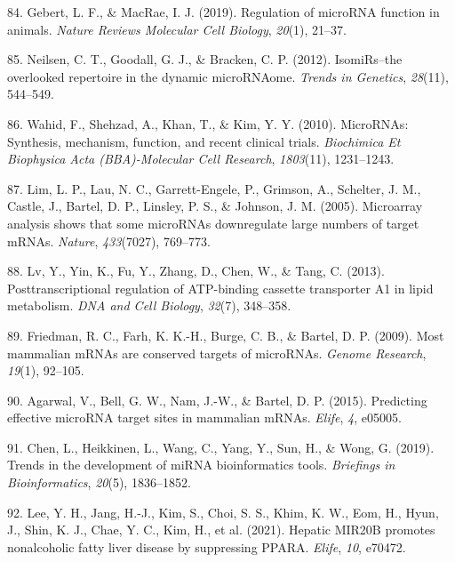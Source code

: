 \documentclass[
  11pt,
  letterpaper,
]{book}
\newlength{\cslhangindent}
\newenvironment{CSLReferences}[2] %
 {\begin{list}{}{%
  \setlength{\itemindent}{0pt}
  \setlength{\leftmargin}{0pt}
  \setlength{\parsep}{0pt}
  \ifodd #1
   \setlength{\leftmargin}{\cslhangindent}
   \setlength{\itemindent}{-1\cslhangindent}
  \fi
  \setlength{\itemsep}{#2\baselineskip}}}
 {\end{list}}
\begin{document}
\begin{CSLReferences}{1}{0}
84. Gebert, L. F., \& MacRae, I. J. (2019). Regulation of microRNA
function in animals. \emph{Nature Reviews Molecular Cell Biology},
\emph{20}(1), 21--37.

85. Neilsen, C. T., Goodall, G. J., \& Bracken, C. P. (2012).
IsomiRs--the overlooked repertoire in the dynamic microRNAome.
\emph{Trends in Genetics}, \emph{28}(11), 544--549.

86. Wahid, F., Shehzad, A., Khan, T., \& Kim, Y. Y. (2010). MicroRNAs:
Synthesis, mechanism, function, and recent clinical trials.
\emph{Biochimica Et Biophysica Acta (BBA)-Molecular Cell Research},
\emph{1803}(11), 1231--1243.

87. Lim, L. P., Lau, N. C., Garrett-Engele, P., Grimson, A., Schelter,
J. M., Castle, J., Bartel, D. P., Linsley, P. S., \& Johnson, J. M.
(2005). Microarray analysis shows that some microRNAs downregulate large
numbers of target mRNAs. \emph{Nature}, \emph{433}(7027), 769--773.

88. Lv, Y., Yin, K., Fu, Y., Zhang, D., Chen, W., \& Tang, C. (2013).
Posttranscriptional regulation of ATP-binding cassette transporter A1 in
lipid metabolism. \emph{DNA and Cell Biology}, \emph{32}(7), 348--358.

89. Friedman, R. C., Farh, K. K.-H., Burge, C. B., \& Bartel, D. P.
(2009). Most mammalian mRNAs are conserved targets of microRNAs.
\emph{Genome Research}, \emph{19}(1), 92--105.

90. Agarwal, V., Bell, G. W., Nam, J.-W., \& Bartel, D. P. (2015).
Predicting effective microRNA target sites in mammalian mRNAs.
\emph{Elife}, \emph{4}, e05005.

91. Chen, L., Heikkinen, L., Wang, C., Yang, Y., Sun, H., \& Wong, G.
(2019). Trends in the development of miRNA bioinformatics tools.
\emph{Briefings in Bioinformatics}, \emph{20}(5), 1836--1852.

92. Lee, Y. H., Jang, H.-J., Kim, S., Choi, S. S., Khim, K. W., Eom, H.,
Hyun, J., Shin, K. J., Chae, Y. C., Kim, H., et al. (2021). Hepatic
MIR20B promotes nonalcoholic fatty liver disease by suppressing PPARA.
\emph{Elife}, \emph{10}, e70472.


\end{CSLReferences}
\end{document}
